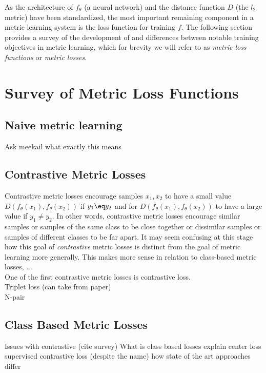 \documentclass[./dissertation.tex]{subfiles}
\begin{document}
    As the architecture of $f_{\theta}$ (a neural network) and the distance function $D$ (the $l_{2}$ metric) have been standardized, the most important remaining component in a metric learning system is the loss function for training $f$. The following section provides a survey of the development of and differences between notable training objectives in metric learning, which for brevity we will refer to as \textit{metric loss functions} or \textit{metric losses}.
    
    \section{Survey of Metric Loss Functions}
    \subsection{Naive metric learning}
    Ask meekail what exactly this means
    \subsection{Contrastive Metric Losses}
    Contrastive metric losses encourage samples $x_{1}, x_{2}$ to have a small value $D(f_{\theta}(x_{1}), f_{\theta}(x_{2}))$ if $y_1 \eq y_2$ and for  $D(f_{\theta}(x_{1}), f_{\theta}(x_{2}))$ to have a large value if $y_1 \neq y_2$. In other words, contrastive metric losses encourage similar samples or samples of the same class to be close together or dissimilar samples or samples of different classes to be far apart. It may seem confusing at this stage how this goal of \textit{contrastive} metric losses is distinct from the goal of metric learning more generally. This makes more sense in relation to class-based metric losses, ... \\
    
    One of the first contrastive metric losses is contrastive loss. \\ 
    
    Triplet loss (can take from paper) \\
    
    N-pair \\
    \subsection{Class Based Metric Losses}
    Issues with contrastive (cite survey)
    What is class based losses
    explain center loss
    supervised contrastive loss (despite the name)
    how state of the art approaches differ
\end{document}
